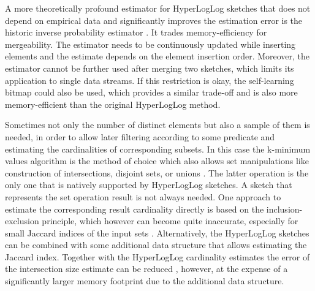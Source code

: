 \documentclass[a4paper]{scrartcl}
\begin{document}
A more theoretically profound estimator for HyperLogLog sketches that does not depend on empirical data and significantly improves the estimation error is the historic inverse probability estimator \cite{Ting2014, Cohen2014}. It trades memory-efficiency for mergeability. The estimator needs to be continuously updated while inserting elements and the estimate depends on the element insertion order. Moreover, the estimator cannot be further used after merging two sketches, which limits its application to single data streams. If this restriction is okay, the self-learning bitmap \cite{Chen2011} 
could also be used, which provides a similar trade-off and is also 
more memory-efficient than the original HyperLogLog method. 

Sometimes not only the number of distinct elements but also a sample of them is needed, in order to allow later filtering according to some predicate and estimating the cardinalities of corresponding subsets. In this case the k-minimum values algorithm \cite{Beyer2007} is the method of choice which also allows set manipulations like construction of intersections, disjoint sets, or unions \cite{Dasgupta2015}. The latter operation is the only one that is natively supported by HyperLogLog sketches. A sketch that represents the set operation result is not always needed. One approach to estimate the corresponding result cardinality directly is based on the inclusion-exclusion principle, which however can become quite inaccurate, especially for small Jaccard indices of the input sets \cite{Dasgupta2015}. Alternatively, the HyperLogLog sketches can be combined with some additional data structure that allows estimating the Jaccard index. Together with the HyperLogLog cardinality estimates the error of the intersection size estimate can be reduced \cite{Pascoe2013, Cohen2016}, however, at the expense of a significantly larger memory footprint due to the additional data structure.
\end{document}

